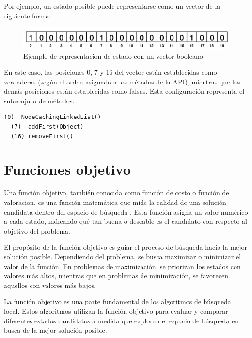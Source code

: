 Por ejemplo, un estado posible puede representarse como un vector de la siguiente forma:


\begin{figure}[H]
  \centering
  \includegraphics[width=1.0\textwidth]{images/cromosoma.png}
  \caption{Ejemplo de representacion de estado con un vector booleano}
  \label{fig:cromosoma}
\end{figure}

En este caso, las posiciones 0, 7 y 16 del vector están establecidas como verdaderas (según el orden asignado a los métodos de la API), mientras que las demás posiciones están establecidas como falsas. Esta configuración representa el subconjuto de métodos:
\vspace{5pt} 

\begin{lstlisting}[numbers=none, caption=Métodos generadores de objetos que representa el cromosoma de la Figura \ref{fig:cromosoma}, captionpos=b, frame=tb , xleftmargin=0pt, basicstyle=\scriptsize]
  (0)  NodeCachingLinkedList()
  (7)  addFirst(Object)
  (16) removeFirst()
\end{lstlisting}

\section{Funciones objetivo}
\label{sec:fitness}

Una función objetivo, también conocida como función de costo o función de valoracion, es una función matemática que mide la calidad de una solución candidata dentro del espacio de búsqueda \cite{Russell:2009}. Esta función asigna un valor numérico a cada estado, indicando qué tan buena o deseable es el candidato con respecto al objetivo del problema.

El propósito de la función objetivo es guiar el proceso de búsqueda hacia la mejor solución posible. Dependiendo del problema, se busca maximizar o minimizar el valor de la función. En problemas de maximización, se priorizan los estados con valores más altos, mientras que en problemas de minimización, se favorecen aquellos con valores más bajos.

La función objetivo es una parte fundamental de los algoritmos de búsqueda local. Estos algoritmos utilizan la función objetivo para evaluar y comparar diferentes estados candidatos a medida que exploran el espacio de búsqueda en busca de la mejor solución posible.

